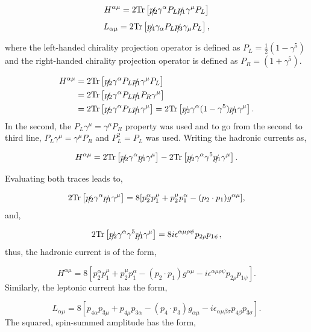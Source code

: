 \documentclass[a4paper,11pt]{article}
\begin{document}
 $$ H^{\alpha\mu} = 2\text{Tr}\left[\slashed{p_2}\gamma^\alpha P_L \slashed{p_1} \gamma^\mu P_L     \right]$$
$$ L_{\alpha\mu} = 2\text{Tr}\left[ \slashed{p_4}\gamma_\alpha P_L \slashed{p_3} \gamma_\mu P_L \right],$$

where the left-handed chirality projection operator is defined as $P_L = \frac{1}{2}(1-\gamma^5)$ and the right-handed chirality projection operator is defined as $P_R= (1+\gamma^5)$. 

\begin{equation*}
	\begin{aligned}
	 H^{\alpha\mu} &= 2\text{Tr}\left[\slashed{p_2}\gamma^\alpha P_L \slashed{p_1} \gamma^\mu P_L     \right]\\
	 &= 2\text{Tr}\left[\slashed{p_2}\gamma^\alpha P_L \slashed{p_1} P_R \gamma^\mu \right]\\
	 		&= 2\text{Tr}\left[\slashed{p_2}\gamma^\alpha P_L \slashed{p_1} \gamma^\mu \right] = 2\text{Tr}\left[\slashed{p_2}\gamma^\alpha (1-\gamma^5) \slashed{p_1} \gamma^\mu \right]  .
	\end{aligned}
\end{equation*}
In the second, the $P_L \gamma^\mu =\gamma^\mu P_R$ property was used and to go from the second to third line, $P_L \gamma^\mu =\gamma^\mu P_R$ and  $P_L^2 = P_L$ was used. Writing the hadronic currents as, 

$$H^{\alpha\mu} = 2\text{Tr}\left[\slashed{p_2}\gamma^\alpha\slashed{p_1} \gamma^\mu \right] - 2\text{Tr}\left[\slashed{p_2}\gamma^\alpha\gamma^5\slashed{p_1} \gamma^\mu \right].$$

Evaluating both traces leads to,

$$2\text{Tr}\left[\slashed{p_2}\gamma^\alpha\slashed{p_1} \gamma^\mu \right] = 8[p_2^\alpha p_1^\mu + p_2^\mu p_1^\alpha - (p_2 \cdot p_1) g^{\alpha \mu}],$$
and, 

$$2\text{Tr}\left[\slashed{p_2}\gamma^\alpha\gamma^5\slashed{p_1} \gamma^\mu \right] = 8i \epsilon^{\alpha \mu \rho \psi}p_{2\rho}p_{1\psi}, $$
thus, the hadronic current is of the form, 

$$
H^{\alpha\mu} = 8[p_2^\alpha p_1^\mu + p_2^\mu p_1^\alpha - (p_2 \cdot p_1) g^{\alpha \mu} - i \epsilon^{\alpha \mu \rho \psi}p_{2\rho}p_{1\psi}].
$$
Similarly, the leptonic current has the form, 

$$
L_{\alpha\mu} = 8[p_{4\alpha} p_{3\mu} + p_{4\mu} p_{3\alpha} - (p_4 \cdot p_3) g_{\alpha \mu} - i \epsilon_{\alpha \mu \beta \sigma}p_{4\beta}p_{3\sigma}].
$$
The squared, spin-summed amplitude has the form,
\end{document}
